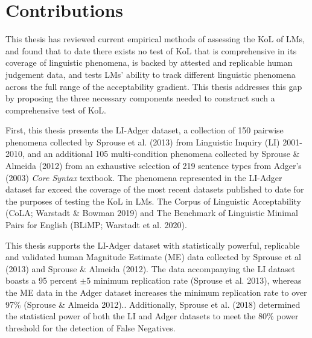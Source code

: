 \chapter*{Contributions}

This thesis has reviewed current empirical methods of assessing the KoL of LMs, and found that to date there exists no test of KoL that is comprehensive in its coverage of linguistic phenomena, is backed by attested and replicable human judgement data, and tests LMs' ability to track different linguistic phenomena across the full range of the acceptability gradient.  This thesis addresses this gap by proposing the three necessary components needed to construct such a comprehensive test of KoL.

First, this thesis presents the LI-Adger dataset, a collection of 150 pairwise phenomena collected by Sprouse et al. (2013) from Linguistic Inquiry (LI) 2001-2010, and an additional 105 multi-condition phenomena collected by Sprouse \& Almeida (2012) from an exhaustive selection of 219 sentence types from Adger's (2003) \textit{Core Syntax} textbook.  The phenomena represented in the LI-Adger dataset far exceed the coverage of the most recent datasets published to date for the purposes of testing the KoL in LMs.  The Corpus of Linguistic Acceptability (CoLA; Warstadt \& Bowman 2019) and The Benchmark of Linguistic Minimal Pairs for English (BLiMP; Warstadt et al. 2020).

This thesis supports the LI-Adger dataset with statistically powerful, replicable and validated human Magnitude Estimate (ME) data collected by Sprouse et al (2013) and Sprouse \& Almeida (2012).  The data accompanying the LI dataset boasts a 95 percent $\pm5$ minimum replication rate (Sprouse et al. 2013), whereas the ME data in the Adger dataset increases the minimum replication rate to over 97\% (Sprouse \& Almeida 2012)..  Additionally, Sprouse et al. (2018) determined the statistical power of both the LI and Adger datasets to meet the 80\% power threshold for the detection of False Negatives.

